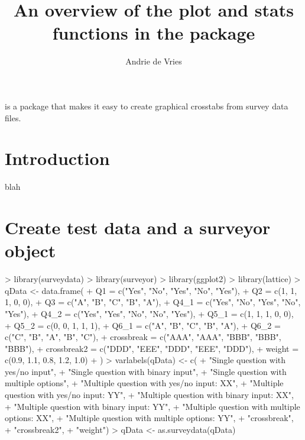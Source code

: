 \documentclass[10pt,oneside]{article}
\begin{document}
\pagestyle{empty}

\setlength{\baselineskip}{1.25em}
\setlength{\parskip}{0.5em}
\setlength{\parindent}{0.0em}



\title{An overview of the plot and stats functions in the \surveyor{} package}
\author{Andrie de Vries}
\maketitle{}

\surveyor{} is a package that makes it easy to create graphical crosstabs from survey data files.  


\section{Introduction}

blah


\section{Create test data and a surveyor object}

\begin{Schunk}
\begin{Sinput}
> library(surveydata)
> library(surveyor)
> library(ggplot2)
> library(lattice)
> qData <- data.frame(
+     Q1 = c("Yes", "No", "Yes", "No", "Yes"),
+     Q2 = c(1, 1, 1, 0, 0),
+     Q3 = c("A", "B", "C", "B", "A"),
+     Q4_1 = c("Yes", "No", "Yes", "No", "Yes"), 
+     Q4_2 = c("Yes", "Yes", "No", "No", "Yes"), 
+     Q5_1 = c(1, 1, 1, 0, 0),
+     Q5_2 = c(0, 0, 1, 1, 1),
+     Q6_1 = c("A", "B", "C", "B", "A"),
+     Q6_2 = c("C", "B", "A", "B", "C"),
+     crossbreak = c("AAA", "AAA", "BBB", "BBB", "BBB"), 
+     crossbreak2 = c("DDD", "EEE", "DDD", "EEE", "DDD"),
+     weight = c(0.9, 1.1, 0.8, 1.2, 1.0)
+ )
> varlabels(qData) <- c(
+     "Single question with yes/no input", 
+     "Single question with binary input",
+     "Single question with multiple options",
+     "Multiple question with yes/no input: XX", 
+     "Multiple question with yes/no input: YY", 
+     "Multiple question with binary input: XX",
+     "Multiple question with binary input: YY",
+     "Multiple question with multiple options: XX",
+     "Multiple question with multiple options: YY",
+     "crossbreak",
+     "crossbreak2",
+     "weight")
> qData <- as.surveydata(qData)
\end{Sinput}
\end{Schunk}
\end{document}
